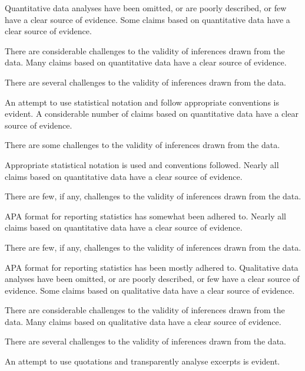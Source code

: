 \documentclass{../../fal_assignment}
\begin{document}
\begin{markingrubric}
%
        \grade\fail 	Quantitative data analyses have been omitted, or are poorly described, or few have a clear source of evidence.
        \grade		Some claims based on quantitative data have a clear source of evidence.
	\par 		There are considerable challenges to the validity of inferences drawn from the data.
        \grade		Many claims based on quantitative data have a clear source of evidence.
        \par 		There are several challenges to the validity of inferences drawn from the data.
	\par 		An attempt to use statistical notation and follow appropriate conventions is evident.
        \grade		A considerable number of claims based on quantitative data have a clear source of evidence.
        \par		There are some challenges to the validity of inferences drawn from the data.
        \par 		Appropriate statistical notation is used and conventions followed.
        \grade		Nearly all claims based on quantitative data have a clear source of evidence.
        \par		There are few, if any, challenges to the validity of inferences drawn from the data.
        \par 		APA format for reporting statistics has somewhat been adhered to.
        \grade		Nearly all claims based on quantitative data have a clear source of evidence.
        \par		There are few, if any, challenges to the validity of inferences drawn from the data.
        \par 		APA format for reporting statistics has been mostly adhered to.
%
        \grade\fail 	Qualitative data analyses have been omitted, or are poorly described, or few have a clear source of evidence.
        \grade		Some claims based on qualitative data have a clear source of evidence.
	\par 		There are considerable challenges to the validity of inferences drawn from the data.
        \grade		Many claims based on qualitative data have a clear source of evidence.
        \par 		There are several challenges to the validity of inferences drawn from the data.
	\par 		An attempt to use quotations and transparently analyse excerpts is evident.

\end{markingrubric}
\end{document}

